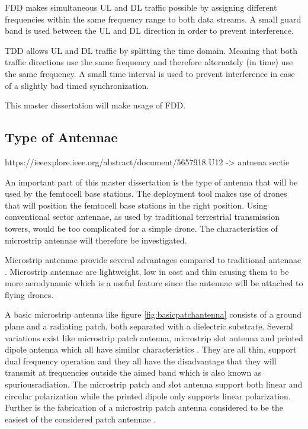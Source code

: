 \gls{FDD} makes simultaneous \gls{UL} and \gls{DL} traffic possible by assigning different frequencies within the same frequency range 
to both data streams. A small guard band is used between the \gls{UL} and \gls{DL} direction in order to prevent interference.

\gls{TDD} allows  \gls{UL} and \gls{DL} traffic by splitting the time domain. Meaning that both traffic directions use the same frequency and therefore
alternately (in time) use the same frequency. A small time interval is used to prevent interference in case of a slightly bad timed synchronization.

This master dissertation will make usage of \gls{FDD}.

\subsection{Type of Antennae} %
https://ieeexplore.ieee.org/abstract/document/5657918
U12 -> antnena sectie


An important part of this master dissertation is the type of antenna that will be used by the femtocell base stations. The deployment tool makes use
of drones that will position the femtocell base stations in the right position.  Using conventional 
sector antennae, as used by traditional terrestrial transmission towers, would be too complicated for a simple drone. 
The characteristics of microstrip antennae will therefore be investigated.

Microstrip antennae provide several advantages compared to traditional antennae \cite{J13_singh2011micro, J14_antennadesign}. Microstrip antennae
are lightweight, low in cost and thin causing them to be more aerodynamic which is a useful feature since the antennae will be attached
to flying drones.

A basic microstrip antenna like figure \ref{fig:basicpatchantenna} consists of a ground plane and
a radiating patch, both separated with a dielectric substrate. 
Several variations exist like microstrip patch antenna, microstrip slot antenna and printed dipole antenna which
all have similar characteristics \cite{J13_singh2011micro, J14_antennadesign}. They are all thin, support dual frequency operation and they all have the disadvantage that they 
will transmit at frequencies outside the aimed band which is also known as
\gls{spuriousradiation}. The microstrip patch and slot antenna support both linear
and circular polarization while the printed dipole only supports linear polarization. Further is the fabrication of a microstrip patch antenna considered to be the easiest of the considered patch antennae \cite{J13_singh2011micro}. 

